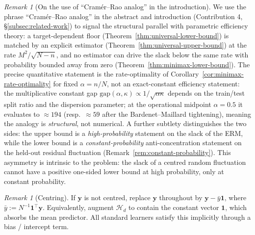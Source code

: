 \documentclass[11pt,a4paper]{article}
\theoremstyle{plain}
\theoremstyle{definition}
\theoremstyle{remark}
\newtheorem{remark}[theorem]{Remark}
\newcommand{\by}{\mathbf{y}}
\newcommand{\bone}{\mathbf{1}}
\newcommand{\Hcal}{\mathcal{H}}
\begin{document}
\begin{remark}[On the use of ``Cram\'er--Rao analog'' in the introduction]
\label{rem:cramer-rao-framing}
We use the phrase ``Cram\'er--Rao analog'' in the abstract and
introduction (Contribution 4, \S\ref{subsec:related-work}) to
signal the structural parallel with parametric efficiency
theory: a target-dependent floor
(Theorem~\ref{thm:universal-lower-bound}) is matched by an
explicit estimator (Theorem~\ref{thm:universal-upper-bound}) at
the rate $M^2/\sqrt{N-n}$, and no estimator can drive the slack
below the same rate with probability bounded away from zero
(Theorem~\ref{thm:minimax-lower-bound}).  The precise quantitative
statement is the rate-optimality of
Corollary~\ref{cor:minimax-rate-optimality} for fixed
$\alpha = n/N$, not an exact-constant efficiency statement: the
multiplicative constant gap $\mathrm{gap}(\alpha, \kappa)
\propto 1/\sqrt{\alpha\kappa}$ depends on the train/test split
ratio and the dispersion parameter; at the operational midpoint
$\alpha = 0.5$ it evaluates to $\approx 194$ (resp.\ $\approx 59$
after the Bardenet--Maillard tightening), meaning the analogy is
\emph{structural}, not numerical.  A further subtlety distinguishes
the two sides: the upper bound is a \emph{high-probability}
statement on the slack of the ERM, while the lower bound is a
\emph{constant-probability} anti-concentration statement on the
held-out residual fluctuation (Remark~\ref{rem:constant-probability}).
This asymmetry is intrinsic to the problem: the slack of a
centred random fluctuation cannot have a positive one-sided
lower bound at high probability, only at constant probability.
\end{remark}

\begin{remark}[Centring]
\label{rem:centring}
If $\by$ is not centred, replace $\by$ throughout by $\by - \bar y \bone$,
where $\bar y := N^{-1}\bone^\top \by$.  Equivalently, augment
$\Hcal_d$ to contain the constant vector $\bone$, which absorbs the
mean predictor.  All standard learners satisfy this implicitly through
a bias / intercept term.
\end{remark}
\end{document}
